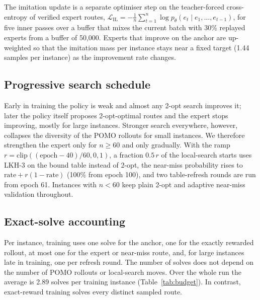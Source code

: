 \documentclass[preprint,review,12pt,authoryear]{elsarticle}
\begin{document}
The imitation update is a separate optimiser step on the teacher-forced cross-entropy of verified expert
routes,
$\mathcal L_{\mathrm{IL}}=-\frac{1}{n}\sum_{t=1}^{n}\log p_\theta(e_t\mid e_1,\dots,e_{t-1})$,
for five inner passes over a buffer that mixes the current batch with 30\% replayed experts from a buffer of
50{,}000. Experts that improve on the anchor are up-weighted so that the imitation mass per instance stays
near a fixed target (1.44 samples per instance) as the improvement rate changes.

\subsection{Progressive search schedule}\label{sec:recipe}
Early in training the policy is weak and almost any 2-opt search improves it; later the policy itself proposes
2-opt-optimal routes and the expert stops improving, mostly for large instances. Stronger search everywhere,
however, collapses the diversity of the POMO rollouts for small instances. We therefore strengthen the
expert only for $n\ge60$ and only gradually. With the ramp $r=\mathrm{clip}((\text{epoch}-40)/60,0,1)$, a
fraction $0.5\,r$ of the local-search starts uses LKH-3 \citep{helsgaun2017lkh3} on the bound table instead of
2-opt, the near-miss probability rises to $\text{rate}+r(1-\text{rate})$ (100\% from epoch 100), and two
table-refresh rounds are run from epoch 61. Instances with $n<60$ keep plain 2-opt and adaptive near-miss
validation throughout.

\subsection{Exact-solve accounting}
Per instance, training uses one solve for the anchor, one for the exactly rewarded rollout, at most one for
the expert or near-miss route, and, for large instances late in training, one per refresh round. The number of
solves does not depend on the number of POMO rollouts or local-search moves. Over the whole run the average is
2.89 solves per training instance (Table~\ref{tab:budget}). In contrast, exact-reward training solves every
distinct sampled route.
\end{document}
